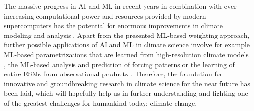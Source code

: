 The massive progress in \ac{AI} and \ac{ML} in recent years in combination with
ever increasing computational power and resources provided by modern
supercomputers has the potential for enormous improvements in climate modeling
and analysis \autocite{Reichstein2019}. Apart from the presented \ac{ML}-based
weighting approach, further possible applications of \ac{AI} and \ac{ML} in
climate science involve for example \ac{ML}-based parametrizations that are
learned from high-resolution climate models \autocite{Rasp2018}, the
\ac{ML}-based analysis and prediction of forcing patterns \autocite{Barnes2019,
  Mansfield2020} or the learning of entire \acp{ESM} from observational
products \autocite{Geer2021}. Therefore, the foundation for innovative and
groundbreaking research in climate science for the near future has been laid,
which will hopefully help us in further understanding and fighting one of the
greatest challenges for humankind today: climate change.
